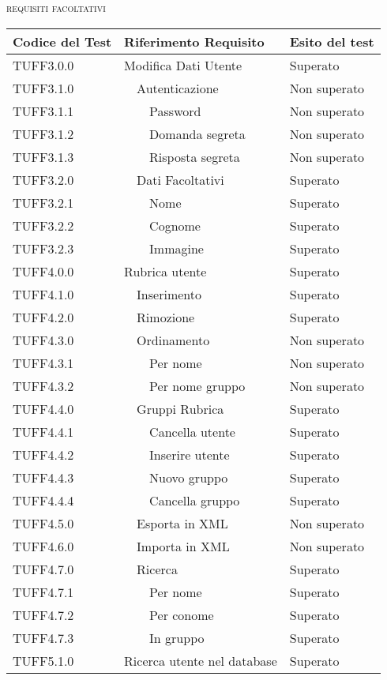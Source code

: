 \begin{center}
\textsc{requisiti facoltativi}
\end{center}
\begin{longtable}{lp{}l}
\toprule Codice del Test & Riferimento Requisito& Esito del test\\
\midrule

TUFF3.0.0&	Modifica Dati Utente		&Superato\\
TUFF3.1.0&	\ \ Autenticazione	&Non superato\\
TUFF3.1.1&	\ \ \ \ Password	&Non superato\\
TUFF3.1.2&	\ \ \ \ Domanda segreta	&Non superato\\
TUFF3.1.3&	\ \ \ \ Risposta segreta	&Non superato\\
TUFF3.2.0&	\ \ Dati Facoltativi	&Superato\\
TUFF3.2.1&	\ \ \ \ Nome	&Superato\\
TUFF3.2.2&	\ \ \ \ Cognome	&Superato\\
TUFF3.2.3&	\ \ \ \ Immagine	&Superato\\
TUFF4.0.0&	Rubrica utente		&Superato\\
TUFF4.1.0&	\ \ Inserimento	&Superato\\
TUFF4.2.0&	\ \ Rimozione	&Superato\\
TUFF4.3.0&	\ \ Ordinamento	&Non superato\\
TUFF4.3.1&	\ \ \ \ Per nome	&Non superato\\
TUFF4.3.2&	\ \ \ \ Per nome gruppo	&Non superato\\
TUFF4.4.0&	\ \ Gruppi Rubrica		&Superato\\
TUFF4.4.1&	\ \ \ \ Cancella utente	&Superato\\
TUFF4.4.2&	\ \ \ \ Inserire utente	&Superato\\
TUFF4.4.3&	\ \ \ \ Nuovo gruppo	&Superato\\
TUFF4.4.4&	\ \ \ \ Cancella gruppo	&Superato\\
TUFF4.5.0&	\ \ Esporta in XML	&Non superato\\
TUFF4.6.0&	\ \ Importa in XML		&Non superato\\
TUFF4.7.0&	\ \ Ricerca	&Superato\\
TUFF4.7.1&	\ \ \ \ Per nome	 &Superato\\
TUFF4.7.2&	\ \ \ \ Per conome	&Superato\\
TUFF4.7.3&	\ \ \ \ In gruppo	&Superato\\
TUFF5.1.0&	Ricerca utente nel database	&Superato\\

\end{longtable}
